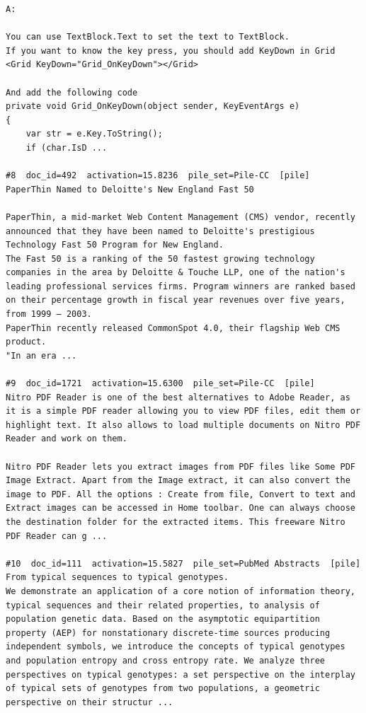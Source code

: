 \begin{verbatim}
A:

You can use TextBlock.Text to set the text to TextBlock.
If you want to know the key press, you should add KeyDown in Grid
<Grid KeyDown="Grid_OnKeyDown"></Grid>

And add the following code
private void Grid_OnKeyDown(object sender, KeyEventArgs e)
{
    var str = e.Key.ToString();
    if (char.IsD ...

#8  doc_id=492  activation=15.8236  pile_set=Pile-CC  [pile]
PaperThin Named to Deloitte's New England Fast 50

PaperThin, a mid-market Web Content Management (CMS) vendor, recently announced that they have been named to Deloitte's prestigious Technology Fast 50 Program for New England.
The Fast 50 is a ranking of the 50 fastest growing technology companies in the area by Deloitte & Touche LLP, one of the nation's leading professional services firms. Program winners are ranked based on their percentage growth in fiscal year revenues over five years, from 1999 – 2003.
PaperThin recently released CommonSpot 4.0, their flagship Web CMS product.
"In an era ...

#9  doc_id=1721  activation=15.6300  pile_set=Pile-CC  [pile]
Nitro PDF Reader is one of the best alternatives to Adobe Reader, as it is a simple PDF reader allowing you to view PDF files, edit them or highlight text. It also allows to load multiple documents on Nitro PDF Reader and work on them.

Nitro PDF Reader lets you extract images from PDF files like Some PDF Image Extract. Apart from the Image extract, it can also convert the image to PDF. All the options : Create from file, Convert to text and Extract images can be accessed in Home toolbar. One can always choose the destination folder for the extracted items. This freeware Nitro PDF Reader can g ...

#10  doc_id=111  activation=15.5827  pile_set=PubMed Abstracts  [pile]
From typical sequences to typical genotypes.
We demonstrate an application of a core notion of information theory, typical sequences and their related properties, to analysis of population genetic data. Based on the asymptotic equipartition property (AEP) for nonstationary discrete-time sources producing independent symbols, we introduce the concepts of typical genotypes and population entropy and cross entropy rate. We analyze three perspectives on typical genotypes: a set perspective on the interplay of typical sets of genotypes from two populations, a geometric perspective on their structur ...

\end{verbatim}

